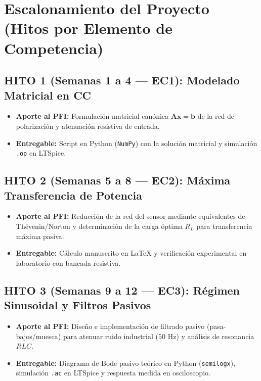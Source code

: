 \documentclass[11pt, a4paper]{article}
\begin{document}
\section{Escalonamiento del Proyecto (Hitos por Elemento de Competencia)}

\subsection*{HITO 1 (Semanas 1 a 4 --- EC1): Modelado Matricial en CC}
\begin{itemize}
    \item \textbf{Aporte al PFI:} Formulación matricial canónica $\mathbf{A}\mathbf{x} = \mathbf{b}$ de la red de polarización y atenuación resistiva de entrada.
    \item \textbf{Entregable:} Script en Python (\texttt{NumPy}) con la solución matricial y simulación \texttt{.op} en LTSpice.
\end{itemize}

\subsection*{HITO 2 (Semanas 5 a 8 --- EC2): Máxima Transferencia de Potencia}
\begin{itemize}
    \item \textbf{Aporte al PFI:} Reducción de la red del sensor mediante equivalentes de Thévenin/Norton y determinación de la carga óptima $R_L$ para transferencia máxima pasiva.
    \item \textbf{Entregable:} Cálculo manuscrito en \LaTeX{} y verificación experimental en laboratorio con bancada resistiva.
\end{itemize}

\subsection*{HITO 3 (Semanas 9 a 12 --- EC3): Régimen Sinusoidal y Filtros Pasivos}
\begin{itemize}
    \item \textbf{Aporte al PFI:} Diseño e implementación de filtrado pasivo (pasa-bajos/muesca) para atenuar ruido industrial ($50\text{ Hz}$) y análisis de resonancia $RLC$.
    \item \textbf{Entregable:} Diagrama de Bode pasivo teórico en Python (\texttt{semilogx}), simulación \texttt{.ac} en LTSpice y respuesta medida en osciloscopio.
\end{itemize}
\end{document}
